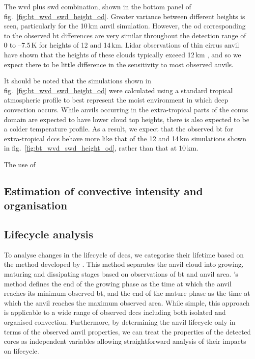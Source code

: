 The \acrshort{wvd} plus \acrshort{swd} combination, shown in the bottom panel of fig.~\ref{fig:bt_wvd_swd_height_od}.
Greater variance between different heights is seen, particularly for the 10\,\unit{km} anvil simulation.
However, the \acrshort{od} corresponding to the observed \acrshort{bt} differences are very similar throughout the detection range of 0 to --7.5\,\unit{K} for heights of 12 and 14\,\unit{km}.
Lidar observations of thin cirrus anvil have shown that the heights of these clouds typically exceed 12\,\unit{km} \citep{wall_observational_2020, horner_evolution_2023}, and so we expect there to be little difference in the sensitivity to most observed anvils.

It should be noted that the simulations shown in fig.~\ref{fig:bt_wvd_swd_height_od} were calculated using a standard tropical atmospheric profile to best represent the moist environment in which deep convection occurs.
While anvils occurring in the extra-tropical parts of the \acrshort{conus} domain are expected to have lower cloud top heights, there is also expected to be a colder temperature profile.
As a result, we expect that the observed \acrshort{bt} for extra-tropical \acrshort{dcc}s behave more like that of the 12 and 14\,\unit{km} simulations shown in fig.~\ref{fig:bt_wvd_swd_height_od}, rather than that at 10\,\unit{km}.

The use of 



\subsection{Estimation of convective intensity and organisation}


\subsection{Lifecycle analysis}

To analyse changes in the lifecycle of \acrshort{dcc}s, we categorise their lifetime based on the method developed by \citet{futyan_deep_2007}.
This method separates the anvil cloud into growing, maturing and dissipating stages based on observations of \acrshort{bt} and anvil area.
\citeauthor{futyan_deep_2007}'s method defines the end of the growing phase as the time at which the anvil reaches its minimum observed \acrshort{bt}, and the end of the mature phase as the time at which the anvil reaches the maximum observed area.
While simple, this approach is applicable to a wide range of observed \acrshort{dcc}s including both isolated and organised convection.
Furthermore, by determining the anvil lifecycle only in terms of the observed anvil properties, we can treat the properties of the detected cores as independent variables allowing straightforward analysis of their impacts on lifecycle.



